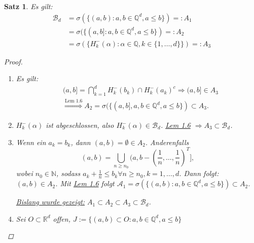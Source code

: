 \documentclass[a4paper]{report}
\newcommand{\R}{\mathbb{R}}
\newcommand{\N}{\mathbb{N}}
\newcommand{\Q}{\mathbb{Q}}
\newcommand{\Borel}{\mathcal{B}}
\newcommand{\Bd}{\Borel_d}
\newcommand{\jlabel}[1]{\label{j_#1}}
\newcommand{\jshortlink}[1]{\jhyperref{#1}{\text{#1}}}
\newcommand{\jhyperref}[2]{\hyperref[j_#1]{#2}}
\newcommand{\jlink}[1]{\jhyperref{#1}{#1}}
\theoremstyle{plain}
\newtheorem{satz}[thm]{Satz}
\theoremstyle{definition}
\begin{document}
{\begin{satz}
\jlabel{Satz 1.9}
    Es gilt:
    \begin{displaymath}
        \begin{split}{}
            \Bd & = \sigma(\{(a,b): a,b \in \Q^d, a \le b\}) =: A_1 \\
                & = \sigma(\{(a,b]: a,b \in \Q^d, a \le b\}) =: A_2 \\
                & = \sigma(\{H_k^-(\alpha): \alpha \in \Q, k \in \{1, \dots, d\}\}) =: A_3
        \end{split}
    \end{displaymath}
    \begin{proof}
        \begin{enumerate}
            \item Es gilt:
            \begin{displaymath}
                \begin{split}
                    &(a,b] = \bigcap_{k=1}^d H_k^-(b_k) \cap H_k^-(a_k)^c \Rightarrow (a,b] \in A_3\\
                    &\overset{\jshortlink{Lem 1.6}}{\Rightarrow} A_2 = \sigma(\{(a,b], a,b \in \Q^d, a \le b\}) \subset A_3.
                \end{split}                
            \end{displaymath}
            \item $H_k^-(\alpha)$ ist abgeschlossen, also $H_k^-(\alpha) \in \Bd$. \jlink{Lem 1.6} $\Rightarrow A_3 \subset \Bd$.
            \item Wenn ein $a_k = b_k$, dann $(a,b)=\emptyset \in A_2$. Anderenfalls
            \begin{displaymath}
                (a,b) = \bigcup_{n \ge n_0} (a, b -\left(\frac{1}{n}, \dots, \frac{1}{n}\right)^T],
            \end{displaymath}
            wobei $n_0\in\N$, sodass $a_k + \frac{1}{n} \le b_k \forall n \ge n_0, k=1,\dots, d$. Dann folgt: $(a,b) \in A_2$. Mit \jlink{Lem 1.6} folgt $\mathcal{A}_1 = \sigma(\{(a,b) : a,b \in \Q^d, a \le b\}) \subset A_2$.
            
            \vspace{12pt}
            
            \uline{Bislang wurde gezeigt:} $A_1 \subset A_2 \subset A_3 \subset \Bd$.
            \item
                Sei $O \subset \R^d$ offen, $J := \{(a,b) \subset O : a,b \in \Q^d, a\le b\}$
                

\end{enumerate}
\end{proof}
\end{satz}}
\end{document}

